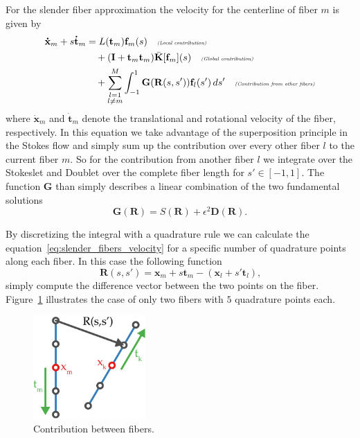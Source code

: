 \documentclass[a4paper,11pt]{kth-mag}
\begin{document}
For the slender fiber approximation the velocity for the centerline of fiber $m$ is given by
\begin{equation}
  \label{eq:slender_fibers_velocity}
  \begin{aligned}
    \mathbf{\dot{x}}_m + s \mathbf{\dot{t}}_m &= L(\mathbf{t}_m) \mathbf{f}_m(s) \quad \textit{\tiny{(Local contribution)}} \\
     &\quad + (\mathbf{I} + \mathbf{t}_m \mathbf{t}_m)\bar{\mathbf{K}}[\mathbf{f}_m](s) \quad \textit{\tiny{(Global contribution)}} \\
     &\quad + \sum_{\substack{l = 1\\l \neq m}}^M \int_{-1}^{1}\mathbf{G}(\mathbf{R}(s,s'))\mathbf{f}_l(s') \,ds' \quad \textit{\tiny{(Contribution from other fibers)}} \\
  \end{aligned}
\end{equation}
where $\mathbf{\dot{x}}_m$ and $\mathbf{\dot{t}}_m$ denote the translational and rotational velocity of the fiber, respectively. In this equation we take advantage of the superposition principle in the Stokes flow and simply sum up the contribution over every other fiber $l$ to the current fiber $m$. So for the contribution from another fiber $l$ we integrate over the Stokeslet and Doublet over the complete fiber length for $s' \in [-1, 1]$. The function $\mathbf{G}$ than simply describes a linear combination of the two fundamental solutions
\begin{equation}
  \label{eq:G}
  \mathbf{G}(\mathbf{R}) = S(\mathbf{R}) + \epsilon^2 \mathbf{D}(\mathbf{R}) \text{.}
\end{equation}

By discretizing the integral with a quadrature rule we can calculate the equation~\eqref{eq:slender_fibers_velocity} for a specific number of quadrature points along each fiber. In this case the following function
\begin{equation}
  \label{eq:fiber_distance}
  \mathbf{R}(s, s') = \mathbf{x}_m + s \mathbf{t}_m - (\mathbf{x}_l + s'\mathbf{t}_l) \text{,}
\end{equation}
simply compute the difference vector between the two points on the fiber. Figure~\ref{fig:fiber_contribution} illustrates the case of only two fibers with $5$ quadrature points each.
\begin{figure}[!htbp]
  \centering
  \includegraphics[width=0.3819660112501450000000\textwidth]{img/fiber_contribution.pdf}
  \caption{Contribution between fibers.}
  \label{fig:fiber_contribution}
\end{figure}
\end{document}
